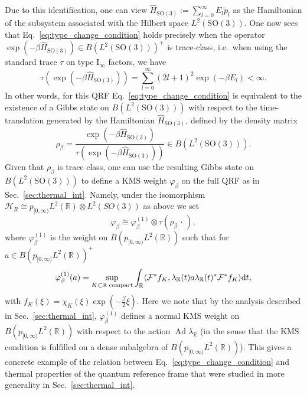 \documentclass[sn-mathphys-num]{sn-jnl}%
\newcommand{\RR}{\mathbb{R}}
\newcommand{\HH}{\mathcal{H}}
\DeclareMathOperator{\Ad}{Ad}
\newcommand{\diff}{\textup{d}}
\numberwithin{equation}{section}
\theoremstyle{thmstyleone}%
\theoremstyle{thmstyletwo}%
\theoremstyle{thmstylethree}%
\begin{document}
Due to this identification, one can view $\hat{H}_{\mathrm{SO}(3)}:=\sum_{l=0}^\infty E_l\tilde{p}_l$ as the Hamiltonian of the subsystem associated with the Hilbert space $L^2(\mathrm{SO}(3))$. One now sees that Eq.\ \eqref{eq:type_change_condition} holds precisely when the operator $\exp(-\beta \hat{H}_{\mathrm{SO}(3)})\in B(L^2(\mathrm{SO}(3)))^+$ is trace-class, i.e.\ when using the standard trace $\tau$ on type $\mathrm{I}_\infty$ factors, we have
\begin{equation}
    \tau(\exp(-\beta \hat{H}_{\mathrm{SO}(3)}))=\sum_{l=0}^\infty (2l+1)^2\exp(-\beta E_l)<\infty.
\end{equation}
In other words, for this QRF Eq.\ \eqref{eq:type_change_condition} is equivalent to the existence of a Gibbs state on $B(L^2(\mathrm{SO}(3)))$ with respect to the time-translation generated by the Hamiltonian $\hat{H}_{\mathrm{SO}(3)}$, defined by the density matrix
\begin{equation}
    \rho_\beta=\frac{\exp(-\beta \hat{H}_{\mathrm{SO}(3)})}{\tau(\exp(-\beta \hat{H}_{\mathrm{SO}(3)}))}\in B(L^2(\mathrm{SO}(3))).
\end{equation} 
Given that $\rho_\beta$ is trace class, one can use the resulting Gibbs state on $B(L^2(\mathrm{SO}(3)))$ to define a KMS weight $\varphi_\beta$ on the full QRF as in Sec.\ \ref{sec:thermal_int}. Namely, under the isomorphism $\HH_R\cong p_{[0,\infty)}L^2(\RR)\otimes L^2(SO(3))$ as above we set
\begin{equation}
    \varphi_\beta\cong \varphi_\beta^{(1)}\otimes \tau(\rho_\beta\,\cdot\,),
\end{equation}
where $\varphi_\beta^{(1)}$ is the weight on $B(p_{[0,\infty)}L^2(\RR))$ such that for $a\in B(p_{[0,\infty)}L^2(\RR))^+$
\begin{equation}
    \varphi_\beta^{(1)}(a)=\sup_{K\subset\RR\text{ compact}}\int_\RR\langle\mathcal{F}^*f_K,\lambda_{\RR}(t)a\lambda_{\RR}(t)^* \mathcal{F}^*f_K\rangle\diff t,
\end{equation}
with $f_K(\xi)=\chi_K(\xi)\exp(-\frac{\beta}{2}\xi)$. Here we note that by the analysis described in Sec.\ \ref{sec:thermal_int}, $\varphi_\beta^{(1)}$ defines a normal KMS weight on $B(p_{[0,\infty)}L^2(\RR))$ with respect to the action $\Ad\lambda_{\RR}$ (in the sense that the KMS condition is fulfilled on a dense subalgebra of $B(p_{[0,\infty)}L^2(\RR))$). This gives a concrete example of the relation between Eq.\ \eqref{eq:type_change_condition} and thermal properties of the quantum reference frame that were studied in more generality in Sec.\ \ref{sec:thermal_int}.  
\end{document}

